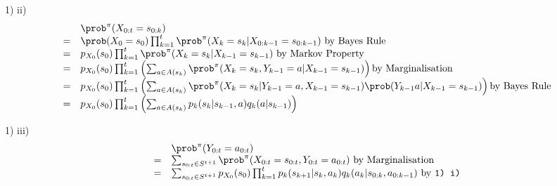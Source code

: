 \documentclass[11pt,a4paper]{article}
\begin{document}
\begin{answer}{1) ii)}
  \[\begin{array}{rl}
    &\prob^\pi(X_{0:t}=s_{0:k})\\
    =&\prob(X_0=s_0)\prod_{k=1}^t\prob^\pi(X_k=s_k|X_{0:k-1}=s_{0:k-1})\text{ by Bayes Rule}\\
    =&p_{X_0}(s_0)\prod_{k=1}^t\prob^\pi(X_k=s_k|X_{k-1}=s_{k-1})\text{ by Markov Property}\\
    =&p_{X_0}(s_0)\prod_{k=1}^t\left(\sum_{a\in A(s_k)}\prob^\pi(X_k=s_k,Y_{k-1}=a|X_{k-1}=s_{k-1})\right)\text{by Marginalisation}\\
    =&p_{X_0}(s_0)\prod_{k=1}^t\left(\sum_{a\in A(s_k)}\prob^\pi(X_k=s_k|Y_{k-1}=a,X_{k-1}=s_{k-1})\prob(Y_{k-1}a|X_{k-1}=s_{k-1})\right)\text{by Bayes Rule}\\
    =&p_{X_0}(s_0)\prod_{k=1}^t\left(\sum_{a\in A(s_k)}p_k(s_k|s_{k-1},a)q_k(a|s_{k-1})\right)
  \end{array}\]
\end{answer}

\begin{answer}{1) iii)}
  \[\begin{array}{rl}
    &\prob^\pi(Y_{0:t}=a_{0:t})\\
    =&\sum_{s_{0:t}\in S^{t+1}}\prob^\pi(X_{0:t}=s_{0:t},Y_{0:t}=a_{0:t})\text{ by Marginalisation}\\
    =&\sum_{s_{0:t}\in S^{t+1}}p_{X_0}(s_0)\prod_{k=1}^tp_k(s_{k+1}|s_k,a_k)q_k(a_k|s_{0:k},a_{0:k-1})\text{ by \texttt{1) i)}}
  \end{array}\]
\end{answer}
\end{document}
